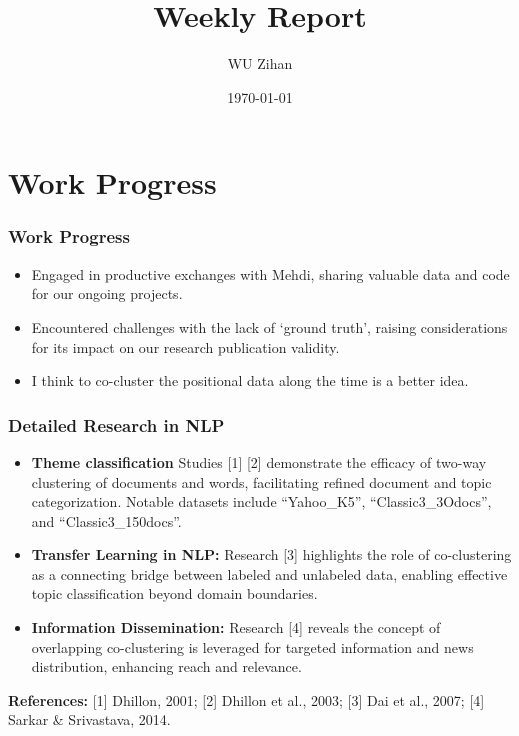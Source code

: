 \documentclass{beamer}
\title{Weekly Report}
\author{WU Zihan}
\date{\today}
\begin{document}
\maketitle

\section{Work Progress}

\begin{frame}
    \frametitle{Work Progress}
    \begin{itemize}
        \item Engaged in productive exchanges with Mehdi, sharing valuable data and code for our ongoing projects.
        \item Encountered challenges with the lack of `ground truth', raising considerations for its impact on our research publication validity.
        \item I think to co-cluster the positional data along the time is a better idea.
    \end{itemize}
\end{frame}

\begin{frame}
    \frametitle{Detailed Research in NLP}
    \begin{itemize}
        \item \textbf{Theme classification} Studies [1] [2] demonstrate the efficacy of two-way clustering of documents and words, facilitating refined document and topic categorization. Notable datasets include ``Yahoo\_K5'', ``Classic3\_3Odocs'', and ``Classic3\_150docs''.
        \item \textbf{Transfer Learning in NLP:} Research [3] highlights the role of co-clustering as a connecting bridge between labeled and unlabeled data, enabling effective topic classification beyond domain boundaries.
        \item \textbf{Information Dissemination:} Research [4] reveals the concept of overlapping co-clustering is leveraged for targeted information and news distribution, enhancing reach and relevance.
    \end{itemize}
    \textbf{References:} [1] Dhillon, 2001; [2] Dhillon et al., 2003; [3] Dai et al., 2007; [4] Sarkar \& Srivastava, 2014.
\end{frame}
\end{document}
